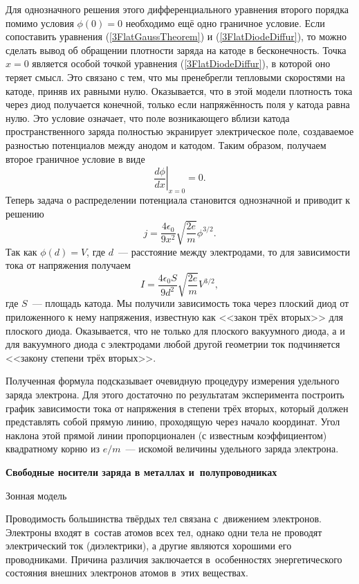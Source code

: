 Для однозначного решения этого дифференциального уравнения второго порядка помимо условия $\phi(0)=0$ необходимо ещё одно граничное условие. Если сопоставить уравнения (\ref{3FlatGaussTheorem}) и (\ref{3FlatDiodeDiffur}), то можно сделать вывод об обращении плотности заряда на катоде в бесконечность. Точка $x=0$ является особой точкой уравнения (\ref{3FlatDiodeDiffur}), в которой оно теряет смысл.
Это связано с тем, что мы пренебрегли тепловыми скоростями на катоде, приняв их равными нулю. Оказывается, что в этой модели плотность тока через диод получается конечной, только если напряжённость поля у катода равна нулю. Это условие означает, что поле возникающего вблизи катода пространственного заряда полностью экранирует электрическое поле, создаваемое разностью потенциалов между анодом и катодом. Таким образом, получаем второе граничное условие в виде
$$
\left.\frac{d\phi}{dx}\right|_{x = 0}=0.
$$
Теперь задача о распределении потенциала становится однозначной и приводит к решению
$$
j=\frac{4\epsilon_0}{9x^2}\sqrt{\frac{2e}{m}}\phi^{3/2}.
$$
Так как $\phi(d)=V$, где $d$~--- расстояние между электродами, то для зависимости тока от напряжения получаем
$$
I=\frac{4\epsilon_0 S}{9d^2}\sqrt{\frac{2e}{m}}V^{3/2},
$$
где $S$~--- площадь катода. Мы получили зависимость тока через плоский диод от приложенного к нему напряжения, известную как <<закон трёх вторых>> для плоского диода. Оказывается, что не только для плоского вакуумного диода, а и для вакуумного диода с электродами любой другой геометрии ток подчиняется <<закону степени трёх вторых>>.

Полученная формула подсказывает очевидную процедуру измерения удельного заряда электрона. Для этого достаточно по
результатам эксперимента построить график зависимости тока от напряжения в степени трёх вторых, который должен
представлять собой прямую линию, проходящую через начало координат. Угол наклона этой прямой линии пропорционален (с известным коэффициентом) квадратному корню из $e/m$~--- искомой величины удельного заряда электрона.

{\large \bf Свободные носители заряда в металлах и~полупроводниках}

{\large  Зонная модель}

Проводимость большинства твёрдых тел связана с~движением электронов. Электроны входят в~состав атомов всех тел, однако одни тела не проводят электрический ток (диэлектрики), а другие являются хорошими его проводниками. Причина различия заключается в~особенностях энергетического состояния внешних электронов атомов в~этих веществах.

